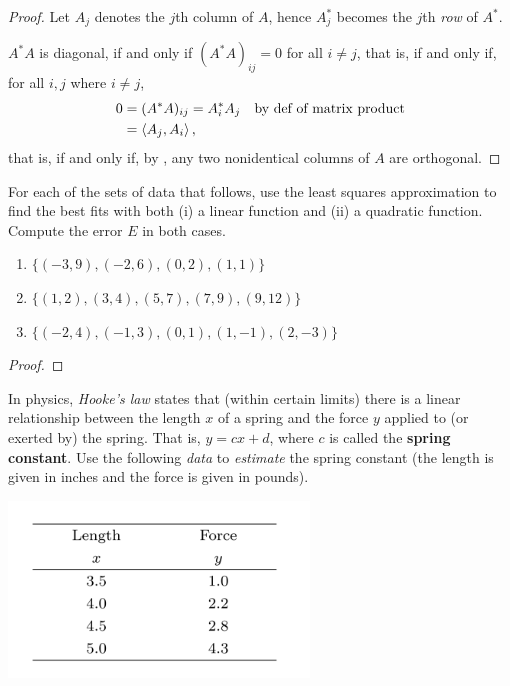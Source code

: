 \begin{proof}
Let \(A_j\) denotes the \(j\)th column of \(A\), hence \(A_j^*\) becomes the \(j\)th \emph{row} of \(A^*\).

\(A^*A\) is diagonal, if and only if \((A^*A)_{ij} = 0\) for all \(i \ne j\),
that is, if and only if, for all \(i, j\) where \(i \ne j\),
\begin{align*}
    0 & = (A^* A)_{ij} = A_i^* A_j & \text{by def of matrix product} \\
      & = \left< A_j, A_i \right>,
\end{align*}
that is, if and only if, by , any two nonidentical columns of \(A\) are orthogonal.
\end{proof}

\begin{exercise} \label{exercise 6.3.20}
For each of the sets of data that follows, use the least squares approximation to find the best fits with both (i) a linear function and (ii) a quadratic function.
Compute the error \(E\) in both cases.
\begin{enumerate}
\item \(\{ (-3, 9), (-2, 6), (0, 2), (1, 1) \}\)
\item \(\{ (1, 2), (3, 4), (5, 7), (7, 9), (9, 12) \}\)
\item \(\{ (-2, 4), (-1, 3), (0, 1), (1, -1), (2, -3) \}\)
\end{enumerate}
\end{exercise}

\begin{proof}
\end{proof}

\begin{exercise} \label{exercise 6.3.21}
In physics, \emph{Hooke's law} states that (within certain limits) there is a linear relationship between the length \(x\) of a spring and the force \(y\) applied to (or exerted by) the spring.
That is, \(y = cx + d\), where \(c\) is called the \textbf{spring constant}.
Use the following \emph{data} to \emph{estimate} the spring constant (the length is given in inches and the force is given in pounds).
\begin{center}
    \includegraphics[width=8cm]{images/table-for-exersice-6-3-21.png}
\end{center}
\end{exercise}

